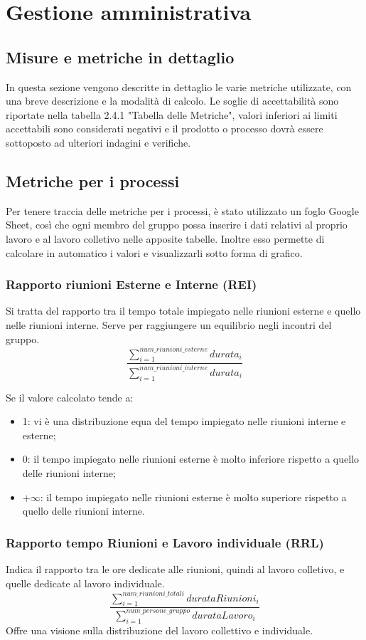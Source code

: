 \section{Gestione amministrativa}
\subsection{Misure e metriche in dettaglio}
In questa sezione vengono descritte in dettaglio le varie metriche utilizzate, con una breve descrizione e la modalità di calcolo. 
Le soglie di accettabilità sono riportate nella tabella 2.4.1 "Tabella delle Metriche", valori inferiori ai limiti accettabili sono considerati negativi e il prodotto o processo dovrà essere sottoposto ad ulteriori indagini e verifiche.
\subsection{Metriche per i processi}
Per tenere traccia delle metriche per i processi, è stato utilizzato un foglo Google Sheet, così che ogni membro del gruppo possa inserire i dati relativi al proprio lavoro e al lavoro colletivo nelle apposite tabelle. Inoltre esso permette di calcolare in automatico i valori e visualizzarli sotto forma di grafico.

\subsubsection{Rapporto riunioni Esterne e Interne (REI)}
Si tratta del rapporto tra il tempo totale impiegato nelle riunioni esterne e quello nelle riunioni interne. Serve per raggiungere un equilibrio negli incontri del gruppo.
\[\frac{\sum_{i=1}^{num\_riunioni\_esterne} durata_i}{\sum_{i=1}^{num\_riunioni\_interne} durata_i}\]

Se il valore calcolato tende a:
\begin{itemize}
    \item 1: vi è una distribuzione equa del tempo impiegato nelle riunioni interne e esterne;
    \item 0: il tempo impiegato nelle riunioni esterne è molto inferiore rispetto a quello delle riunioni interne;
    \item $+\infty$: il tempo impiegato nelle riunioni esterne è molto superiore rispetto a quello delle riunioni interne.
\end{itemize}
\subsubsection{Rapporto tempo Riunioni e Lavoro individuale (RRL)}
Indica il rapporto tra le ore dedicate alle riunioni, quindi al lavoro colletivo, e quelle dedicate al lavoro individuale. 
\[\dfrac{\sum_{i=1}^{num\_riunioni\_totali} durataRiunioni_i}{\sum_{i=1}^{num\_persone\_gruppo} durataLavoro_i}\]
Offre una visione sulla distribuzione del lavoro collettivo e individuale.
